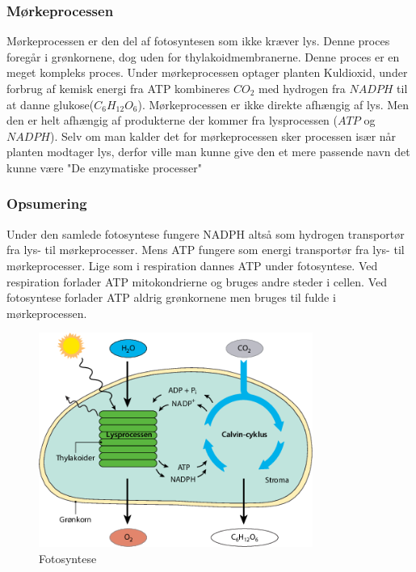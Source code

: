             \subsubsection{Mørkeprocessen}
                Mørkeprocessen er den del af fotosyntesen som ikke kræver lys. Denne proces foregår i grønkornene, dog uden for thylakoidmembranerne. Denne proces er en meget kompleks proces. 
                Under mørkeprocessen optager planten Kuldioxid, under forbrug af kemisk energi fra ATP kombineres \begin{math}CO_2\end{math} med hydrogen fra \begin{math}NADPH\end{math} til at danne glukose(\begin{math}C_6H_{12}O_6\end{math}). Mørkeprocessen er ikke direkte afhængig af lys. Men den er helt afhængig af produkterne der kommer fra lysprocessen (\begin{math}ATP\end{math} og \begin{math}NADPH\end{math}). Selv om man kalder det for mørkeprocessen sker processen især når planten modtager lys, derfor ville man kunne give den et mere passende navn det kunne være "De enzymatiske processer"
            \subsubsection{Opsumering} 
                Under den samlede fotosyntese fungere NADPH altså som hydrogen transportør fra lys- til mørkeprocesser. Mens ATP fungere som energi transportør fra lys- til mørkeprocesser. Lige som i respiration dannes ATP under fotosyntese. Ved respiration forlader ATP mitokondrierne og bruges andre steder i cellen. Ved fotosyntese forlader ATP aldrig grønkornene men bruges til fulde i mørkeprocessen.
                \begin{figure}[h]
                    \centering
                    \includegraphics[width=0.8\textwidth]{figurs/fotosyntese.png}
                    \caption{Fotosyntese}
                    \label{fig:fotosyntese}
                \end{figure}

